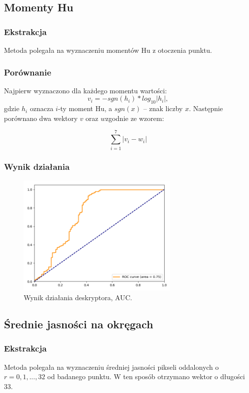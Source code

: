 \documentclass[a4paper,11pt]{article}
\begin{document}
\subsection{Momenty Hu}

\subsubsection{Ekstrakcja}
Metoda polegała na wyznaczeniu momentów Hu z otoczenia punktu. 

\subsubsection{Porównanie}
Najpierw wyznaczono dla każdego momentu wartości:
$$ v_i = -sgn(h_i) * log_{10}|h_i|, $$
gdzie $h_i$ oznacza $i$-ty moment Hu, a $sgn(x)$ -- znak liczby $x$.
Następnie porównano dwa wektory $v$ oraz $w$zgodnie ze wzorem:

$$ \sum_{i=1}^{7}|v_i - w_i|$$

\subsubsection{Wynik działania}

\begin{figure}[H]
\begin{center}
\includegraphics[width=0.7\textwidth]{./img/hu.png}
\end{center}
\caption{Wynik działania deskryptora, AUC.}
\end{figure}

\subsection{Średnie jasności na okręgach}

\subsubsection{Ekstrakcja}
Metoda polegała na wyznaczeniu średniej jasności pikseli oddalonych o $r = 0,1,...,32$ od badanego punktu. 
W ten sposób otrzymano wektor o długości $33$.
\end{document}
